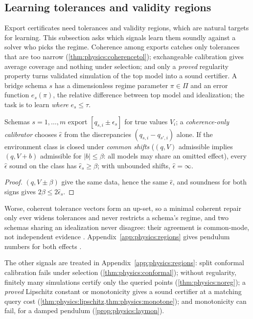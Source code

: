 \subsection{Learning tolerances and validity regions}\label{sec:physics:learning}

Export certificates need tolerances and validity regions, which are natural targets for
learning. This subsection asks which signals learn them soundly against a solver who picks
the regime. Coherence among exports catches only tolerances that are too narrow
(\cref{thm:physics:coherencetol}); exchangeable calibration gives average coverage and
nothing under selection; and only a \emph{proved} regularity property turns validated
simulation of the top model into a sound certifier. A bridge schema $s$ has a
dimensionless regime parameter $\pi\in\Pi$ and an error function $e_s(\pi)$, the relative
difference between top model and idealization; the task is to learn \emph{where}
$e_s\le\tau$.

\begin{theorem}\label{thm:physics:coherencetol}
Schemas $s=1,\dots,m$ export $[q_{s,i}\pm\epsilon_s]$ for true values $V_i$; a
\emph{coherence-only calibrator} chooses $\hat\epsilon$ from the discrepancies
$(q_{s,i}-q_{s',i})$ alone. If the environment class is closed under \emph{common shifts}
($(q,V)$ admissible implies $(q,V+b)$ admissible for $|b|\le\beta$: all models may share an
omitted effect), every $\hat\epsilon$ sound on the class has $\hat\epsilon_s\ge\beta$; with
unbounded shifts, $\hat\epsilon=\infty$.
\hfill{}
\end{theorem}
\begin{proof}
$(q,V\pm\beta)$ give the same data, hence the same $\hat\epsilon$, and soundness for both signs
gives $2\beta\le2\hat\epsilon_s$.
\end{proof}

Worse, coherent tolerance vectors form an up-set, so a minimal coherent repair only ever
widens tolerances and never restricts a schema's regime, and two schemas sharing an
idealization never disagree: their agreement is common-mode, not independent evidence
\citep{levins1966strategy,odenbaugh2011buyer}. Appendix~\ref{app:physics:regions} gives
pendulum numbers for both effects .

The other signals are treated in Appendix~\ref{app:physics:regions}: split conformal
calibration fails under selection (\cref{thm:physics:conformal}); without regularity,
finitely many simulations certify only the queried points (\cref{thm:physics:noreg}); a
\emph{proved} Lipschitz constant or monotonicity gives a sound certifier at a matching
query cost (\cref{thm:physics:lipschitz,thm:physics:monotone}); and monotonicity can fail,
for a damped pendulum (\cref{prop:physics:laymon}).

